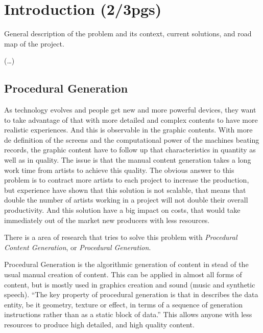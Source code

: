 
% 
% 

\section{Introduction (2/3pgs)}

General description of the problem and its context, current solutions, and road map of the project.

(\dots)

\subsection{Procedural Generation} %
\label{sub:procedural_generation}


As technology evolves and people get new and more powerful devices, they want to take advantage of that with more detailed and complex contents to have more realistic experiences. 
And this is observable in the graphic contents. With more de definition of the screens and the computational power of the machines beating records, the graphic content have to follow up that characteristics in quantity as well as in quality. The issue is that the manual content generation takes a long work time from artists to achieve this quality.
The obvious answer to this problem is to contract more artists to each project to increase the production, but experience have shown that this solution is not scalable, that means that double the number of artists working in a project will not double their overall productivity. And this solution have a big impact on costs, that would take immediately out of the market new producers with less resources.

There is a area of research that tries to solve this problem with \emph{Procedural Content Generation}, or \emph{Procedural Generation}.

Procedural Generation is the algorithmic generation of content in stead of the usual manual creation of content. This can be applied in almost all forms of content, but is mostly used in graphics creation and sound (music and synthetic speech).
``The key property of procedural generation is that in describes the data entity, be it geometry, texture or effect, in terms of a sequence of generation instructions rather than as a static block of data.''\cite{Kelly} This allows anyone with less resources to produce high detailed, and high quality content.



